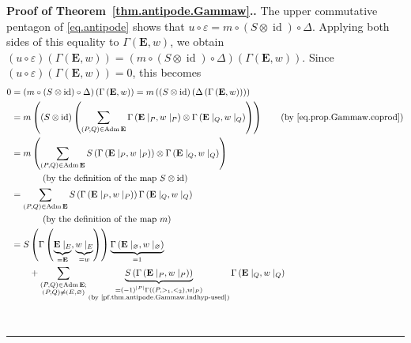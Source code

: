 \documentclass[numbers=enddot,12pt,final,onecolumn,notitlepage,abstracton]{scrartcl}
\theoremstyle{definition}
\newenvironment{proof}[1][Proof]{\noindent\textbf{#1.} }{\ \rule{0.5em}{0.5em}}
\let\sumnonlimits\sum
\renewcommand{\sum}{\sumnonlimits\limits}
\newenvironment{verlong}{}{}
\newcommand{\id}{{\operatorname{id}}}
\newcommand{\Adm}{\operatorname{Adm}}
\newcommand{\EE}{{\mathbf{E}}}
\begin{document}
\begin{proof}[Proof of Theorem~\ref{thm.antipode.Gammaw}.]
\begin{verlong}
The upper commutative pentagon of \eqref{eq.antipode} shows that
$u \circ \varepsilon = m \circ \left(S \otimes \id\right) \circ
\Delta$. Applying both sides of this equality to
$\Gamma\left(\EE, w\right)$, we obtain
$\left(u \circ \varepsilon\right)
\left(\Gamma\left(\EE, w\right)\right)
= \left(m \circ \left(S \otimes \id\right) \circ
\Delta\right) \left(\Gamma\left(\EE, w\right)\right)$.
Since
$\left(u \circ \varepsilon\right)
\left(\Gamma\left(\EE, w\right)\right) = 0$, this
becomes
\begin{align}
0
&= \left(m \circ \left(S \otimes \id\right) \circ
\Delta\right) \left(\Gamma\left(\EE, w\right)\right)
= m \left(\left(S \otimes \id\right) \left(
\Delta \left(\Gamma\left(\EE, w\right)\right)\right)\right)
\nonumber\\
&= m \left(\left(S \otimes \id\right) \left(
\sum_{\left(P, Q\right) \in \Adm \EE}
\Gamma\left(\EE\mid_P, w\mid_P\right)
\otimes \Gamma\left(\EE\mid_Q, w\mid_Q\right) \right) \right)
\qquad \left(\text{by \eqref{eq.prop.Gammaw.coprod}}\right)
\nonumber\\
&= m \left(\sum_{\left(P, Q\right) \in \Adm \EE}
S\left(\Gamma\left(\EE\mid_P, w\mid_P\right)\right)
\otimes
\Gamma\left(\EE\mid_Q, w\mid_Q\right)\right)
\nonumber\\
& \ \ \ \ \ \ \ \ \ \ \left(
  \text{by the definition of the map } S \otimes \id \right)
\nonumber \\
&= \sum_{\left(P, Q\right) \in \Adm \EE}
S\left(\Gamma\left(\EE\mid_P, w\mid_P\right)\right)
\Gamma\left(\EE\mid_Q, w\mid_Q\right)
\nonumber \\
& \ \ \ \ \ \ \ \ \ \ \left(
  \text{by the definition of the map } m \right)
\nonumber \\
&= S \left(\Gamma\left(\underbrace{\EE\mid_E}_{=\EE},
           \underbrace{w\mid_E}_{=w}\right)\right)
  \underbrace{\Gamma\left(\EE\mid_\varnothing, w\mid_\varnothing\right)
             }_{= 1}
     \nonumber \\
& \qquad
  + \sum_{\substack{\left(P, Q\right) \in \Adm \EE ; \\
                    \left(P, Q\right) \neq \left(E, \varnothing\right)}}
  \underbrace{S\left(\Gamma\left(\EE\mid_P, w\mid_P\right)\right)
             }_{\substack{
                = \left(-1\right)^{\left|P\right|}
                  \Gamma\left(\left(P, >_1, <_2\right), w\mid_P\right) \\
                \text{(by \eqref{pf.thm.antipode.Gammaw.indhyp-used})}}}
  \Gamma\left(\EE\mid_Q, w\mid_Q\right)

\end{align}
\end{verlong}
\end{proof}
\end{document}
